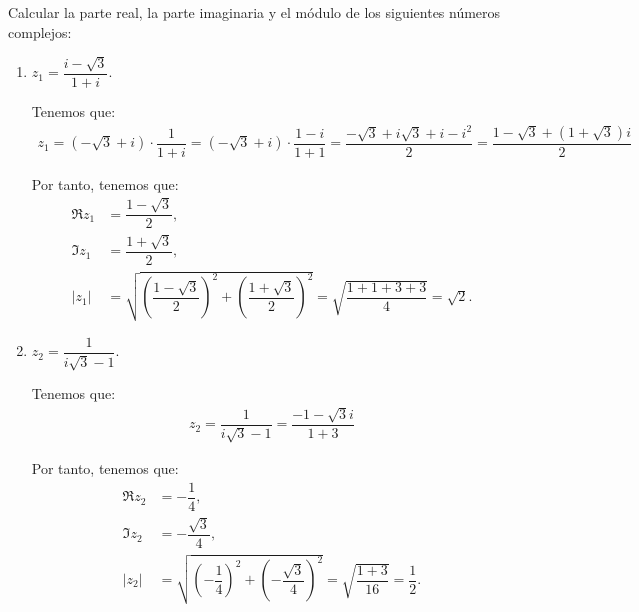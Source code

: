 \begin{ejercicio}
    Calcular la parte real, la parte imaginaria y el módulo de los siguientes números complejos:
    \begin{enumerate}
        \item $z_1 = \dfrac{i-\sqrt{3}}{1+i}$.
        
        Tenemos que:
        \begin{align*}
            z_1 = (-\sqrt{3} + i)\cdot \dfrac{1}{1+i}=
            (-\sqrt{3} + i)\cdot \dfrac{1-i}{1+1}=
            \dfrac{-\sqrt{3}+i\sqrt{3}+i-i^2}{2}
            = \dfrac{1-\sqrt{3}+(1+\sqrt{3})i}{2}
        \end{align*}

        Por tanto, tenemos que:
        \begin{align*}
            \Re z_1 &= \dfrac{1-\sqrt{3}}{2}, \\
            \Im z_1 &= \dfrac{1+\sqrt{3}}{2}, \\
            |z_1| &= \sqrt{\left(\dfrac{1-\sqrt{3}}{2}\right)^2 + \left(\dfrac{1+\sqrt{3}}{2}\right)^2}
            = \sqrt{\dfrac{1+1+3+3}{4}} = \sqrt{2}.
        \end{align*}
        \item $z_2 = \dfrac{1}{i\sqrt{3}-1}$.
        
        Tenemos que:
        \begin{align*}
            z_2 = \dfrac{1}{i\sqrt{3}-1} = \dfrac{-1-\sqrt{3}i}{1+3}
        \end{align*}

        Por tanto, tenemos que:
        \begin{align*}
            \Re z_2 &= -\dfrac{1}{4}, \\
            \Im z_2 &= -\dfrac{\sqrt{3}}{4}, \\
            |z_2| &= \sqrt{\left(-\dfrac{1}{4}\right)^2 + \left(-\dfrac{\sqrt{3}}{4}\right)^2}
            = \sqrt{\dfrac{1+3}{16}} = \dfrac{1}{2}.
        \end{align*}
    \end{enumerate}
\end{ejercicio}

